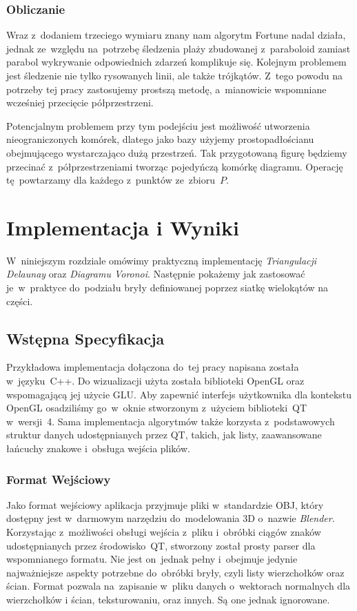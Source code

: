 \documentclass[skorowidz,autorrok,backref,xodstep,oswiadczenie]{wmimgr}
\begin{document}
\subsection{Obliczanie}

Wraz z~dodaniem trzeciego wymiaru znany nam algorytm Fortune nadal działa, jednak ze~względu na~potrzebę śledzenia plaży zbudowanej z~paraboloid zamiast parabol wykrywanie odpowiednich zdarzeń komplikuje się. Kolejnym problemem jest śledzenie nie tylko rysowanych linii, ale także trójkątów. Z~tego powodu na potrzeby tej pracy zastosujemy prostszą metodę, a~mianowicie wspomniane wcześniej przecięcie półprzestrzeni.

Potencjalnym problemem przy tym podejściu jest możliwość utworzenia nieograniczonych komórek, dlatego jako bazy użyjemy prostopadłościanu obejmującego wystarczająco dużą przestrzeń. Tak przygotowaną figurę będziemy przecinać z~półprzestrzeniami tworząc pojedyńczą komórkę diagramu. Operację tę~powtarzamy dla każdego z~punktów ze~zbioru~$P$.

\chapter{Implementacja i Wyniki}

W~niniejszym rozdziale omówimy praktyczną implementację \emph{Triangulacji Delaunay} oraz \emph{Diagramu Voronoi}. Następnie pokażemy jak zastosować je~w~praktyce do~podziału bryły definiowanej poprzez siatkę wielokątów na części.

\section{Wstępna Specyfikacja}

Przykładowa implementacja dołączona do~tej pracy napisana została w~języku~C++. Do wizualizacji użyta została biblioteki OpenGL oraz wspomagającą jej użycie GLU. Aby zapewnić interfejs użytkownika dla kontekstu OpenGL osadziliśmy go~w~oknie stworzonym z~użyciem biblioteki~QT w~wersji~4. Sama implementacja algorytmów także korzysta z~podstawowych struktur danych udostępnianych przez QT, takich, jak listy, zaawansowane łańcuchy znakowe i~obsługa wejścia plików.

\subsection{Format Wejściowy}

Jako format wejściowy aplikacja przyjmuje pliki w~standardzie OBJ, który dostępny jest w~darmowym narzędziu do~modelowania 3D o~nazwie \emph{Blender}. Korzystając z~możliwości obsługi wejścia z~pliku i~obróbki ciągów znaków udostępnianych przez środowisko~QT, stworzony został prosty parser dla wspomnianego formatu. Nie jest on~jednak pełny i~obejmuje jedynie najważniejsze aspekty potrzebne do~obróbki bryły, czyli listy wierzchołków oraz ścian. Format pozwala na~zapisanie w~pliku danych o~wektorach normalnych dla wierzchołków i ścian, teksturowaniu, oraz innych. Są one jednak ignorowane.
\end{document}
